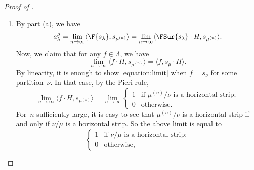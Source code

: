 \begin{proof}[Proof of ]
\begin{enumerate}[label=(\alph*)]
        For the third, by  and the associativity of plethysm, we have
        \begin{align*}
            & \langle s_\lambda, s_\mu[\omega(L_1) - \omega(L_2) + \omega(L_3) - \cdots] \rangle \\
            =& \langle s_\lambda, s_\mu[-(L_1 + L_2 + L_3 + \cdots)[-p_1]] \rangle \\
            =& \langle s_\lambda, (s_\mu[-(L_1 + L_2 + L_3 + \cdots)]) [-p_1] \rangle \\
            =& \langle s_\lambda[-p_1], s_\mu[-(L_1 + L_2 + L_3 + \cdots)] \rangle \\
            =& \langle (-1)^m \omega(s_\lambda)[p_1], (-1)^n \omega(s_\mu)[L_1 + L_2 + L_3 + \cdots] \rangle \\
            =& (-1)^{m - n} \langle s_{\lambda^T}, s_{\mu^T}[L_1 + L_2 + L_3 + \cdots] \rangle 
        \end{align*}
        as desired.
        \item By part (a), we have
        \begin{equation}\label{equation:amulambda}
            a^\mu_{\lambda}
            = \lim_{n \to \infty} \langle \F{s_\lambda}, s_{\mu^{(n)}} \rangle 
            = \lim_{n \to \infty} \langle \FSur{s_\lambda} \cdot H, s_{\mu^{(n)}} \rangle.
        \end{equation}
        Now, we claim that for any $f \in \Lambda$, we have
        \begin{equation}\label{equation:limit}
            \lim_{n \to \infty} \langle f \cdot H, s_{\mu^{(n)}} \rangle = \langle f, s_\mu \cdot H \rangle.
        \end{equation}
        By linearity, it is enough to show \eqref{equation:limit} when $f = s_\nu$ for some partition~$\nu$. In that case, by the Pieri rule,
        \[
            \lim_{n \to \infty} \langle f \cdot H, s_{\mu^{(n)}} \rangle = \lim_{n \to \infty} \begin{cases} 1 & \mbox{if $\mu^{(n)}/\nu$ is a horizontal strip;} \\ 0 & \mbox{otherwise.}\end{cases}
        \]
        For~$n$ sufficiently large, it is easy to see that $\mu^{(n)}/\nu$ is a horizontal strip if and only if $\nu / \mu$ is a horizontal strip. So the above limit is equal to
        \[
            \begin{cases} 1 & \mbox{if $\nu/\mu$ is a horizontal strip;} \\ 0 & \mbox{otherwise,}\end{cases}
\]
\end{enumerate}
\end{proof}
